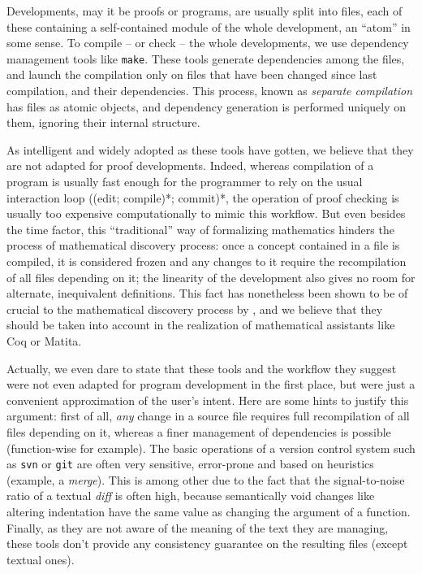 \documentclass[twoside,a4paper,12pt]{article}
\begin{document}
Developments, may it be proofs or programs, are usually split into
files, each of these containing a self-contained module of the whole
development, an ``atom'' in some sense. To compile -- or check -- the
whole developments, we use dependency management tools like
\texttt{make}. These tools generate dependencies among the files, and
launch the compilation only on files that have been changed since last
compilation, and their dependencies. This process, known as
\emph{separate compilation} has files as atomic objects, and
dependency generation is performed uniquely on them, ignoring their
internal structure.

As intelligent and widely adopted as these tools have gotten, we
believe that they are not adapted for proof developments. Indeed,
whereas compilation of a program is usually fast enough for the
programmer to rely on the usual interaction loop ((edit; compile)*;
commit)*, the operation of proof checking is usually too expensive
computationally to mimic this workflow. But even besides the time
factor, this ``traditional'' way of formalizing mathematics hinders
the process of mathematical discovery process: once a concept
contained in a file is compiled, it is considered frozen and any
changes to it require the recompilation of all files depending on it;
the linearity of the development also gives no room for alternate,
inequivalent definitions. This fact has nonetheless been shown to be
of crucial to the mathematical discovery process by
\cite{lakatos1964proofs}, and we believe that they should be taken
into account in the realization of mathematical assistants like
\textsf{Coq} or \textsf{Matita}.

Actually, we even dare to state that these tools and the workflow they
suggest were not even adapted for program development in the first
place, but were just a convenient approximation of the user's intent.
Here are some hints to justify this argument: first of all, \emph{any}
change in a source file requires full recompilation of all files
depending on it, whereas a finer management of dependencies is
possible (function-wise for example). The basic operations of a
version control system such as \texttt{svn} or \texttt{git} are often
very sensitive, error-prone and based on heuristics (example, a
\emph{merge}). This is among other due to the fact that the
signal-to-noise ratio of a textual \emph{diff} is often high, because
semantically void changes like altering indentation have the same
value as changing the argument of a function. Finally, as they are not
aware of the meaning of the text they are managing, these tools don't
provide any consistency guarantee on the resulting files (except
textual ones).
\end{document}
